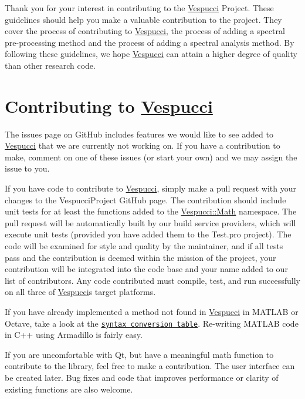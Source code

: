 Thank you for your interest in contributing to the \hyperlink{namespace_vespucci}{Vespucci} Project. These guidelines should help you make a valuable contribution to the project. They cover the process of contributing to \hyperlink{namespace_vespucci}{Vespucci}, the process of adding a spectral pre-\/processing method and the process of adding a spectral analysis method. By following these guidelines, we hope \hyperlink{namespace_vespucci}{Vespucci} can attain a higher degree of quality than other research code.

\section*{Contributing to \hyperlink{namespace_vespucci}{Vespucci} }

The issues page on Git\+Hub includes features we would like to see added to \hyperlink{namespace_vespucci}{Vespucci} that we are currently not working on. If you have a contribution to make, comment on one of these issues (or start your own) and we may assign the issue to you.

If you have code to contribute to \hyperlink{namespace_vespucci}{Vespucci}, simply make a pull request with your changes to the Vespucci\+Project Git\+Hub page. The contribution should include unit tests for at least the functions added to the {\ttfamily \hyperlink{namespace_vespucci_1_1_math}{Vespucci\+::\+Math}} namespace. The pull request will be automatically built by our build service providers, which will execute unit tests (provided you have added them to the Test.\+pro project). The code will be examined for style and quality by the maintainer, and if all tests pass and the contribution is deemed within the mission of the project, your contribution will be integrated into the code base and your name added to our list of contributors. Any code contributed must compile, test, and run successfully on all three of \hyperlink{namespace_vespucci}{Vespucci}\textquotesingle{}s target platforms.

If you have already implemented a method not found in \hyperlink{namespace_vespucci}{Vespucci} in M\+A\+T\+L\+AB or Octave, take a look at the \href{http://arma.sourceforge.net/docs.html#syntax}{\tt syntax conversion table}. Re-\/writing M\+A\+T\+L\+AB code in C++ using Armadillo is fairly easy.

If you are uncomfortable with Qt, but have a meaningful math function to contribute to the library, feel free to make a contribution. The user interface can be created later. Bug fixes and code that improves performance or clarity of existing functions are also welcome.

